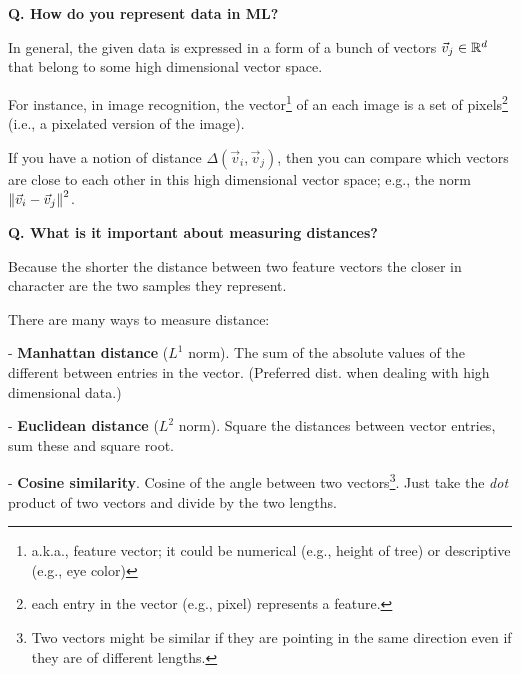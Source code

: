 \begin{frame}[fragile]{\textbf{Q. How do you represent data in ML?}}
  \begin{wideitemize}
    \item In general, the given data is expressed in a form of a bunch of vectors
    $\vec{v}_{j} \in {\Bbb R}^{d}$ that belong to some high dimensional vector space.
    \item For instance, in image recognition, the vector\footnote{a.k.a., feature
    vector; it could be numerical (e.g., height of tree) or descriptive
    (e.g., eye color)} of an each image is a set of pixels\footnote{each entry
    in the vector (e.g., pixel) represents a feature.} (i.e., a pixelated
    version of the image).
    \item If you have a notion of distance $\Delta(\vec{v}_{i}, \vec{v}_{j})$,
    then you can compare which vectors are close to each other in this high
    dimensional vector space; e.g., the norm $\left\lVert \vec{v}_{i} - \vec{v}_{j} \right\rVert^2$.
  \end{wideitemize}
\end{frame}

\begin{frame}[fragile, label={distance}]{\textbf{Q. What is it important about measuring distances?}}
  \begin{wideitemize}
    \item Because the shorter the distance between two feature vectors the closer
    in character are the two samples they represent.
    \item There are many ways to measure distance:
    \begin{wideitemize}
      \item[-] \textbf{Manhattan distance} ($L^{1}$ norm). The sum of the absolute values of the different between
      entries in the vector. (Preferred dist. when dealing with high dimensional data.)
      \item[-] \textbf{Euclidean distance} ($L^{2}$ norm). Square the distances between vector entries,
      sum these and square root.
      \item[-] \textbf{Cosine similarity}. Cosine of the angle between two vectors\footnote{Two vectors
      might be similar if they are pointing in the same direction even if they are of different lengths.}.
      Just take the \textit{dot} product of two vectors and divide by the two lengths.
    \end{wideitemize}
  \end{wideitemize}
\end{frame}

